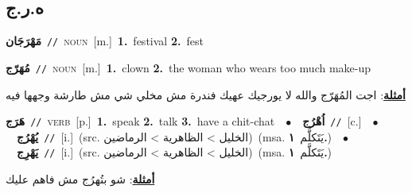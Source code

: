 \documentclass[10pt,a4paper,twoside]{article} %
\begin{document}
\begin{multicols}{2}
\vspace{-3mm}
\subsection*{\color{blue}\foreignlanguage{arabic}{ه.ر.ج}\color{blue}{}} 

{\setlength\topsep{0pt}\textbf{\foreignlanguage{arabic}{مَهْرَجَان}}\ {\color{gray}\texttt{//}\color{black}}\ \textsc{noun}\ [m.]\ \textbf{1.}~festival  \textbf{2.}~fest\ } \vspace{2mm}

{\setlength\topsep{0pt}\textbf{\foreignlanguage{arabic}{مُهَرّج}}\ {\color{gray}\texttt{//}\color{black}}\ \textsc{noun}\ [m.]\ \textbf{1.}~clown  \textbf{2.}~the woman who wears too much make-up\  \begin{flushright}\color{gray}\foreignlanguage{arabic}{\textbf{\underline{\foreignlanguage{arabic}{أمثلة}}}: اجت المُهَرّج والله لا يورجيك عهيك فندرة مش مخلي شي مش طارشة وجهها فيه}\end{flushright}\color{black}} \vspace{2mm}

{\setlength\topsep{0pt}\textbf{\foreignlanguage{arabic}{هَرَج}}\ {\color{gray}\texttt{//}\color{black}}\ \textsc{verb}\ [p.]\ \textbf{1.}~speak  \textbf{2.}~talk  \textbf{3.}~have a chit-chat\ \ $\bullet$\ \ \setlength\topsep{0pt}\textbf{\foreignlanguage{arabic}{اُهْرُج}}\ {\color{gray}\texttt{//}\color{black}}\ [c.]\ \ $\bullet$\ \ \setlength\topsep{0pt}\textbf{\foreignlanguage{arabic}{يُهْرُج}}\ {\color{gray}\texttt{//}\color{black}}\ [i.]\ (src. \color{gray}\foreignlanguage{arabic}{الخليل > الظاهرية > الرماضين}\color{black})\ \color{gray}(msa. \foreignlanguage{arabic}{يَتَكلَّم}~\foreignlanguage{arabic}{\textbf{١.}})\color{black}\ \ $\bullet$\ \ \setlength\topsep{0pt}\textbf{\foreignlanguage{arabic}{يَهْرِج}}\ {\color{gray}\texttt{//}\color{black}}\ [i.]\ (src. \color{gray}\foreignlanguage{arabic}{الخليل > الظاهرية > الرماضين}\color{black})\ \color{gray}(msa. \foreignlanguage{arabic}{يَتَكلَّم}~\foreignlanguage{arabic}{\textbf{١.}})\color{black}\  \begin{flushright}\color{gray}\foreignlanguage{arabic}{\textbf{\underline{\foreignlanguage{arabic}{أمثلة}}}: شو بتُهرُج مش فاهم عليك}\end{flushright}\color{black}} \vspace{2mm}


\end{multicols}
\end{document}
